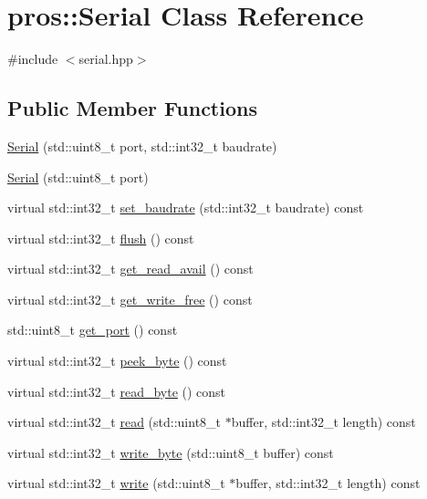 \hypertarget{classpros_1_1Serial}{}\section{pros\+:\+:Serial Class Reference}
\label{classpros_1_1Serial}


{\ttfamily \#include $<$serial.\+hpp$>$}

\subsection*{Public Member Functions}
\begin{DoxyCompactItemize}
\item 
\hyperlink{classpros_1_1Serial_a20b7c3c88af816af3078939b048dcf4b}{Serial} (std\+::uint8\+\_\+t port, std\+::int32\+\_\+t baudrate)
\item 
\hyperlink{classpros_1_1Serial_a32311eebb33cab5a52e0a8743d3bd9da}{Serial} (std\+::uint8\+\_\+t port)
\item 
virtual std\+::int32\+\_\+t \hyperlink{classpros_1_1Serial_ab8c6d804852e6689d6c92c6b2c439824}{set\+\_\+baudrate} (std\+::int32\+\_\+t baudrate) const
\item 
virtual std\+::int32\+\_\+t \hyperlink{classpros_1_1Serial_a4d897c6f3f83636f4d4627ab02c10e76}{flush} () const
\item 
virtual std\+::int32\+\_\+t \hyperlink{classpros_1_1Serial_aca502997319088ea71cf870fbbca7eb8}{get\+\_\+read\+\_\+avail} () const
\item 
virtual std\+::int32\+\_\+t \hyperlink{classpros_1_1Serial_a08daf4a3df3e3c4924d66d0b2eb91538}{get\+\_\+write\+\_\+free} () const
\item 
std\+::uint8\+\_\+t \hyperlink{classpros_1_1Serial_a74560cbf9ec7bc3f49cbf54aadb049a9}{get\+\_\+port} () const
\item 
virtual std\+::int32\+\_\+t \hyperlink{classpros_1_1Serial_a5ec51db5a7726f2220723971c1999881}{peek\+\_\+byte} () const
\item 
virtual std\+::int32\+\_\+t \hyperlink{classpros_1_1Serial_a59c62f236867ec160668389a47d09a5e}{read\+\_\+byte} () const
\item 
virtual std\+::int32\+\_\+t \hyperlink{classpros_1_1Serial_a0d42f31fa7a5bd936010a346167c1946}{read} (std\+::uint8\+\_\+t $\ast$buffer, std\+::int32\+\_\+t length) const
\item 
virtual std\+::int32\+\_\+t \hyperlink{classpros_1_1Serial_a16477199d136d4f2ccbc73281d03965b}{write\+\_\+byte} (std\+::uint8\+\_\+t buffer) const
\item 
virtual std\+::int32\+\_\+t \hyperlink{classpros_1_1Serial_a865313d3b482d9ffdd380edc36273b24}{write} (std\+::uint8\+\_\+t $\ast$buffer, std\+::int32\+\_\+t length) const
\end{DoxyCompactItemize}


